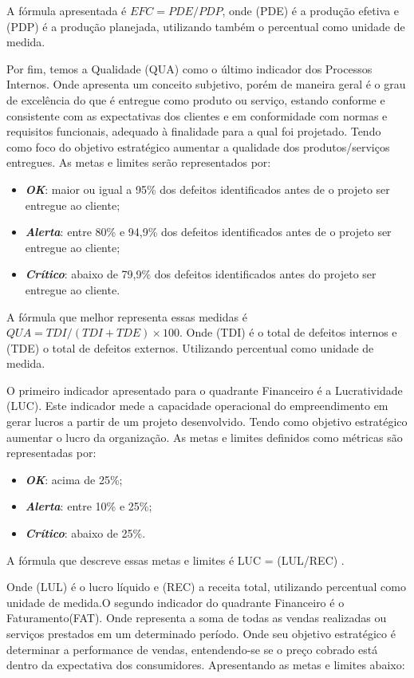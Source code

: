 \documentclass[
	12pt,				%
	openright,			%
	oneside,			%
	a4paper,			%
	english,			%
	brazil				%
	]{abntex2}
\begin{document}
A fórmula apresentada é $EFC = PDE/PDP$, onde (PDE) é a produção efetiva e (PDP) é a produção planejada, utilizando também o percentual como unidade de medida.

Por fim, temos a Qualidade (QUA) como o último indicador dos Processos Internos. Onde apresenta um conceito subjetivo, porém de maneira geral é o grau de excelência do que é entregue como produto ou serviço, estando conforme e consistente com as expectativas dos clientes e em conformidade com normas e requisitos funcionais, adequado à finalidade para a qual foi projetado. Tendo como foco do objetivo estratégico aumentar a qualidade dos produtos/serviços entregues. As metas e limites serão representados por: 
\begin{itemize}
\item  \textbf{\textit{OK}}: maior ou igual a 95\% dos defeitos identificados antes de o projeto ser entregue ao cliente;
\item  \textbf{\textit{Alerta}}: entre 80\% e 94,9\% dos defeitos identificados antes de o projeto ser entregue ao cliente;
\item  \textbf{\textit{Crítico}}: abaixo de 79,9\% dos defeitos identificados antes do projeto ser entregue ao cliente.
\end{itemize}

A fórmula que melhor representa essas medidas é $QUA = TDI/(TDI+TDE) \times 100$. Onde (TDI) é o total de defeitos internos e (TDE) o total de defeitos externos. Utilizando percentual como unidade de medida.

O primeiro indicador apresentado para o quadrante Financeiro é a Lucratividade (LUC). Este indicador mede a capacidade operacional do empreendimento em gerar lucros a partir de um projeto desenvolvido. Tendo como objetivo estratégico aumentar o lucro da organização. As metas e limites definidos como métricas são representadas por:
\begin{itemize}
\item  \textbf{\textit{OK}}: acima de 25\%;
\item  \textbf{\textit{Alerta}}: entre 10\% e 25\%;
\item  \textbf{\textit{Crítico}}: abaixo de 25\%.
\end{itemize}

A fórmula que descreve essas metas e limites é LUC = (LUL/REC) . 

Onde (LUL) é o lucro líquido  e (REC) a receita total, utilizando percentual como unidade de medida.O segundo indicador do quadrante Financeiro é o Faturamento(FAT). Onde representa a soma de todas as vendas realizadas ou serviços prestados em um determinado período. Onde seu objetivo estratégico é determinar a performance de vendas, entendendo-se se o preço cobrado está dentro da expectativa dos consumidores. Apresentando as metas e limites abaixo:
\end{document}
